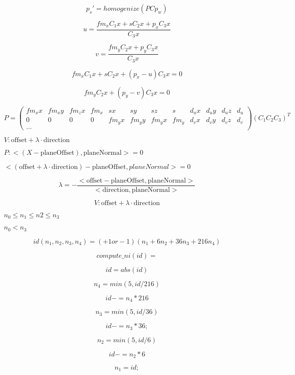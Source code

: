 \documentclass{article}
\begin{document}
\[ p_s' = homogenize(P C p_w) \]
\pagebreak

\[ u = \frac{fm_x C_1 x + s C_2 x + p_x C_3 x}{C_3 x} \]
\pagebreak

\[ v = \frac{fm_y C_2 x + p_y C_3 x}{C_3 x} \]
\pagebreak

\[ fm_x C_1 x + s C_2 x + (p_x - u) C_3 x = 0 \]
\pagebreak

\[ fm_y C_2 x + (p_y - v) C_3 x = 0 \]
\pagebreak

\[ P = \left(\begin{array}{cccccccccccc} fm_x x & fm_x y & fm_z x & fm_x & s x & s y & s z & s & d_u x & d_u y & d_u z & d_u \\ 0 & 0 & 0 & 0 & fm_y x & fm_y y & fm_y x & fm_y & d_v x & d_v y & d_v z & d_v \\ ... \end{array}\right) ( C_1 C_2 C_3 )^T \]
\pagebreak

$V: \mbox{offset} + \lambda \cdot \mbox{direction} $
\pagebreak

$ P: < (X - \mbox{planeOffset}), \mbox{planeNormal}> = 0 $
\pagebreak

$<(\mbox{offset} + \lambda \cdot \mbox{direction}) - \mbox{planeOffset},planeNormal> = 0$
\pagebreak

\[ \lambda = - \frac{<\mbox{offset}-\mbox{planeOffset},\mbox{planeNormal}>}{<\mbox{direction},\mbox{planeNormal}>} \]
\pagebreak

\[ V: \mbox{offset} + \lambda \cdot \mbox{direction} \]
\pagebreak

$n_0 \leq n_1 \leq n2 \leq n_3 $
\pagebreak

$ n_0 < n_3 $
\pagebreak

\[ id(n_1,n_2,n_3,n_4) = (+1 or -1)(n_1 + 6 n_2 + 36 n_3 + 216 n_4) \]
\pagebreak

\[ compute\_ni(id) = \]
\pagebreak

\[ id = abs(id) \]
\pagebreak

\[ n_4 = min(5,id/216) \]
\pagebreak

\[ id -= n_4*216 \]
\pagebreak

\[ n_3 = min(5,id/36) \]
\pagebreak

\[ id -= n_3*36; \]
\pagebreak

\[ n_2 = min(5,id/6) \]
\pagebreak

\[ id -= n_2*6 \]
\pagebreak

\[ n_1 = id; \]
\pagebreak
\end{document}
